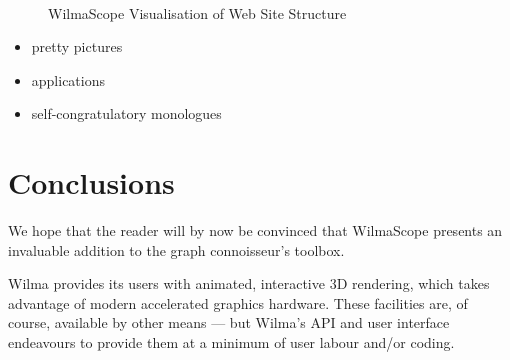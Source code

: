 \documentclass[runningheads]{cl2emult}
\begin{document}
\begin{figure}
\begin{center}
 \\
\caption{{\sc WilmaScope Visualisation of Web Site Structure}}
\label{fig-web}
\end{center}
\end{figure}

\begin{itemize}
\item pretty pictures
\item applications
\item self-congratulatory monologues
\end{itemize}

\section{Conclusions}
\label{sec:conclusions}

We hope that the reader will by now be convinced that WilmaScope presents an
invaluable addition to the graph connoisseur's toolbox.  

Wilma provides its users with animated, interactive 3D rendering, which takes
advantage of modern accelerated graphics hardware.  These facilities are, of
course, available by other means --- but Wilma's API and user interface
endeavours to provide them at a minimum of user labour and/or coding.
\end{document}
